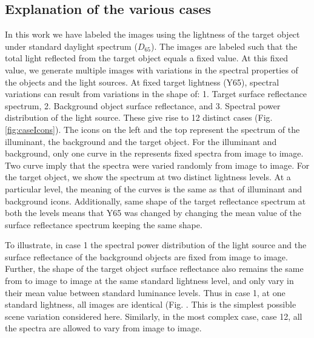 \documentclass{jov}
\begin{document}
\subsection{Explanation of the various cases}
In this work we have labeled the images using the lightness of the target object under  standard daylight spectrum ($D_65$). The images are labeled such that the total light reflected from the target object equals a fixed value. At this fixed value, we generate multiple images with variations in the spectral properties of the objects and the light sources. At fixed target lightness (Y65), spectral variations can result from variations in the shape of: 1. Target surface reflectance spectrum, 2. Background object surface reflectance, and 3. Spectral power distribution of the light source. These give rise to 12 distinct cases (Fig. \ref{fig:caseIcons}). The icons on the left and the top represent the spectrum of the illuminant, the background and the target object. For the illuminant and background, only one curve in the represents fixed spectra from image to image. Two curve imply that the spectra were varied randomly from image to image. For the target object, we show the spectrum at two distinct lightness levels. At a particular level, the meaning of the curves is the same as that of illuminant and background icons. Additionally, same shape of the target reflectance spectrum at both the levels means that Y65 was changed by changing the mean value of the surface reflectance spectrum keeping the same shape.


To illustrate, in case 1 the spectral power distribution of the light source and the surface reflectance of the background objects are fixed from image to image. Further, the shape of the target object surface reflectance also remains the same from to image to image at the same standard lightness level, and only vary in their mean value between standard luminance levels. Thus in case 1, at one standard lightness, all images are identical (Fig. . This is the simplest possible scene variation considered here. Similarly, in the most complex case, case 12, all the spectra are allowed to vary from image to image. 





\end{document}
